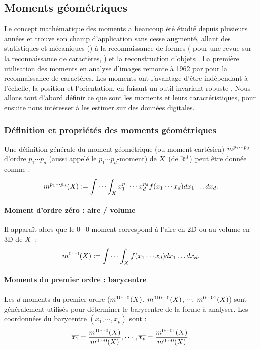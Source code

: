 \subsection{Moments géométriques}
%
Le concept mathématique des moments a beaucoup été étudié depuis plusieurs
années et trouve son champ d'application sans cesse augmenté, allant des
statistiques et mécaniques () \cite{} à la
reconnaissance de formes ( pour une revue sur la
reconnaissance de caractères, \cite{}) et la reconstruction d'objets \cite{Ghorbel2005}.
La première utilisation des moments en analyse d'images remonte à 1962 par
 pour la reconnaissance de caractères.
%
Les moments ont l'avantage d'être indépendant à l'échelle, la position et
l'orientation, en faisant un outil invariant robuste \cite{}. Nous allons tout
d'abord définir ce que sont les moments et leurs caractéristiques, pour ensuite
nous intéresser à les estimer sur des données digitales.
%
%
\subsubsection{Définition et propriétés des moments géométriques}%
\label{sec:definitions-moments}
%
Une définition générale du moment géométrique (ou moment cartésien) $m^{p_1
\cdots p_d}$ d'ordre $p_1 \cdots p_d$ (aussi appelé le $p_1 \cdots p_d$-moment)
de $X$ (de $\mathbb{R}^d$) peut être donnée comme :
%
\begin{equation}
  m^{p_1 \cdots p_d}(X) := \idotsint_{X} x_1^{p_1} \cdots x_d^{p_d} f(x_1 \cdots x_d) dx_1 \ldots dx_d.
\end{equation}
%
\paragraph{Moment d'ordre zéro : aire / volume}
%
Il apparaît alors que le $0\cdots0$-moment correspond à l'aire en 2D ou au
volume en 3D de $X$ :
%
\begin{equation}
  m^{0 \cdots 0}(X) := \idotsint_{X} f(x_1 \cdots x_d) dx_1 \ldots dx_d.
\end{equation}
%
\paragraph{Moments du premier ordre : barycentre}
%
Les $d$ moments du premier ordre ($m^{1 0 \cdots 0}(X)$, $m^{0 1 0
\cdots 0}(X)$, $\cdots$, $m^{0 \cdots 0 1}(X)$) sont généralement
utilisés pour déterminer le barycentre de la forme à analyser. Les coordonnées
du barycentre $(\overline{x_1}, \cdots, \overline{x_p})$ sont :
%
\begin{equation}
  \overline{x_1} = \frac{m^{1 0 \cdots 0}(X)}{m^{0 \cdots 0}(X)}, \cdots, \overline{x_p} = \frac{m^{0 \cdots 0 1}(X)}{m^{0 \cdots 0}(X)}.
\end{equation}
%

